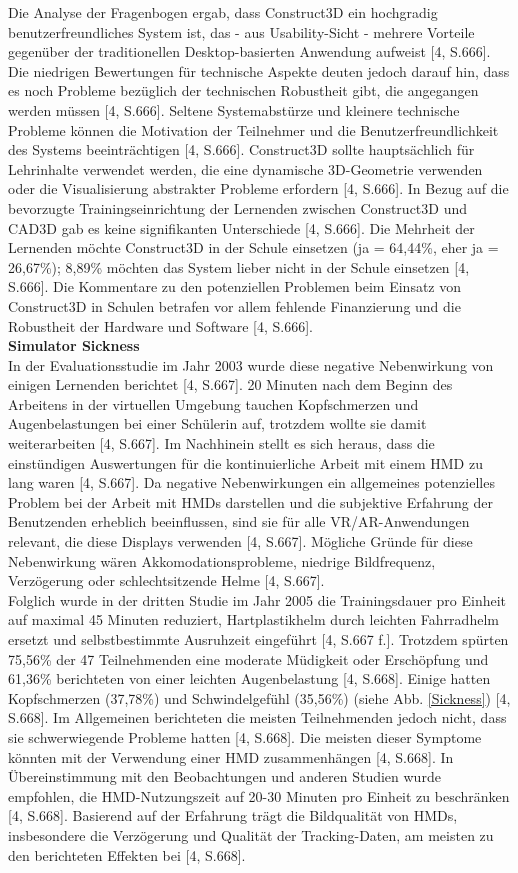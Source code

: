 \documentclass[deutsch]{llncs}
\begin{document}
Die Analyse der Fragenbogen ergab, dass Construct3D ein hochgradig benutzerfreundliches System ist, das - aus Usability-Sicht - mehrere Vorteile gegenüber der traditionellen Desktop-basierten Anwendung aufweist [4, S.666]. Die niedrigen Bewertungen für technische Aspekte deuten jedoch darauf hin, dass es noch Probleme bezüglich der technischen Robustheit gibt, die angegangen werden müssen [4, S.666]. Seltene Systemabstürze und kleinere technische Probleme können die Motivation der Teilnehmer und die Benutzerfreundlichkeit des Systems beeinträchtigen [4, S.666]. Construct3D sollte hauptsächlich für Lehrinhalte verwendet werden, die eine dynamische 3D-Geometrie verwenden oder die Visualisierung abstrakter Probleme erfordern [4, S.666]. In Bezug auf die bevorzugte Trainingseinrichtung der Lernenden zwischen Construct3D und CAD3D gab es keine signifikanten Unterschiede [4, S.666]. Die Mehrheit der Lernenden möchte Construct3D in der Schule einsetzen (ja = 64,44\%, eher ja = 26,67\%); 8,89\% möchten das System lieber nicht in der Schule einsetzen [4, S.666].  Die Kommentare zu den potenziellen Problemen beim Einsatz von Construct3D in Schulen betrafen vor allem fehlende Finanzierung und die Robustheit der Hardware und Software [4, S.666].\\
\textbf{Simulator Sickness}\\
In der Evaluationsstudie im Jahr 2003 wurde diese negative Nebenwirkung von einigen Lernenden berichtet [4, S.667]. 20 Minuten nach dem Beginn des Arbeitens in der virtuellen Umgebung tauchen Kopfschmerzen und Augenbelastungen bei einer Schülerin auf, trotzdem wollte sie damit weiterarbeiten [4, S.667]. Im Nachhinein stellt es sich heraus, dass die einstündigen Auswertungen für die kontinuierliche Arbeit mit einem HMD zu lang waren [4, S.667]. Da negative Nebenwirkungen ein allgemeines potenzielles Problem bei der Arbeit mit HMDs darstellen und die subjektive Erfahrung der Benutzenden erheblich beeinflussen, sind sie für alle VR/AR-Anwendungen relevant, die diese Displays verwenden [4, S.667]. Mögliche Gründe für diese Nebenwirkung wären Akkomodationsprobleme, niedrige Bildfrequenz, Verzögerung oder schlechtsitzende Helme [4, S.667].\\
Folglich wurde in der dritten Studie im Jahr 2005 die Trainingsdauer pro Einheit auf maximal 45 Minuten reduziert, Hartplastikhelm durch leichten Fahrradhelm ersetzt und selbstbestimmte Ausruhzeit eingeführt [4, S.667 f.]. Trotzdem spürten 75,56\% der 47 Teilnehmenden eine moderate Müdigkeit oder Erschöpfung und 61,36\% berichteten von einer leichten Augenbelastung [4, S.668]. Einige hatten Kopfschmerzen (37,78\%) und Schwindelgefühl (35,56\%) (siehe Abb. \ref{Sickness}) [4, S.668]. Im Allgemeinen berichteten die meisten Teilnehmenden jedoch nicht, dass sie schwerwiegende Probleme hatten [4, S.668]. Die meisten dieser Symptome könnten mit der Verwendung einer HMD zusammenhängen [4, S.668]. In Übereinstimmung mit den Beobachtungen und anderen Studien wurde empfohlen, die HMD-Nutzungszeit auf 20-30 Minuten pro Einheit zu beschränken [4, S.668]. Basierend auf der Erfahrung trägt die Bildqualität von HMDs, insbesondere die Verzögerung und Qualität der Tracking-Daten, am meisten zu den berichteten Effekten bei [4, S.668].\\
\end{document}
